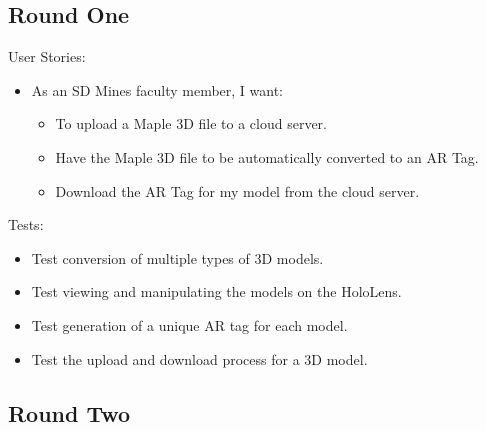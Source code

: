 
\subsection{Round One}

User Stories:
\begin{itemize}
	\item As an SD Mines faculty member, I want:
		\begin{itemize}
			\item To upload a Maple 3D file to a cloud server.
			\item Have the Maple 3D file to be automatically converted to an AR 
			Tag.
			\item Download the AR Tag for my model from the cloud server.
		\end{itemize}
\end{itemize}
Tests:
\begin{itemize}
	\item Test conversion of multiple types of 3D models.
	\item Test viewing and manipulating the models on the HoloLens.
	\item Test generation of a unique AR tag for each model.
	\item Test the upload and download process for a 3D model.
\end{itemize}

\subsection{Round Two}

